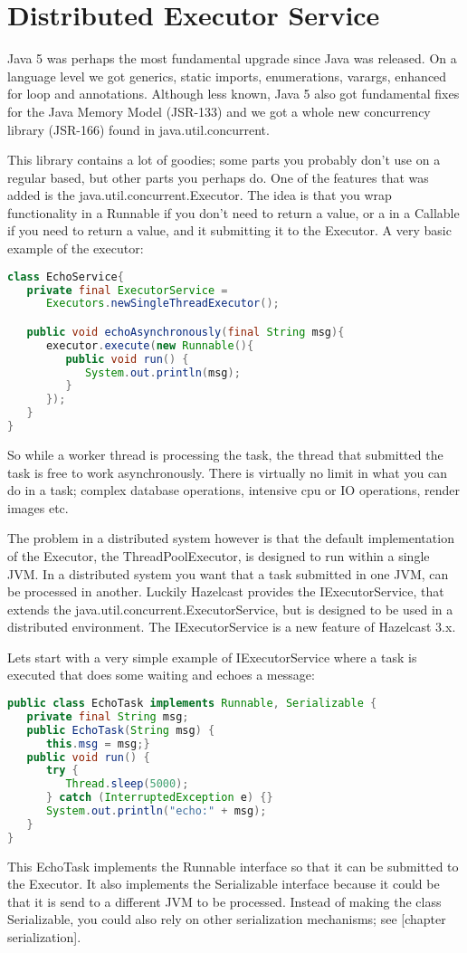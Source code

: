 \chapter{Distributed Executor Service}
Java 5 was perhaps the most fundamental upgrade since Java was released. On a language level we got generics, static imports, enumerations, varargs, enhanced for loop and annotations. Although less known, Java 5 also got fundamental fixes for the Java Memory Model (JSR-133) and we got a whole new concurrency library (JSR-166) found in java.util.concurrent.

This library contains a lot of goodies; some parts you probably don't use on a regular based, but other parts you perhaps do. One of the features that was added is the java.util.concurrent.Executor. The idea is that you wrap functionality in a Runnable if you don't need to return a value, or a in a Callable if you need to return a value, and it submitting it to the Executor. A very basic example of the executor:
\begin{lstlisting}[language=java]
class EchoService{
   private final ExecutorService = 
      Executors.newSingleThreadExecutor();

   public void echoAsynchronously(final String msg){
      executor.execute(new Runnable(){
         public void run() { 
            System.out.println(msg); 
         }
      });	
   }
}
\end{lstlisting}
So while a worker thread is processing the task, the thread that submitted the task is free to work asynchronously. There is virtually no limit in what you can do in a task; complex database operations, intensive cpu or IO operations, render images etc. 

The problem in a distributed system however is that the default implementation of the Executor, the ThreadPoolExecutor, is designed to run within a single JVM. In a distributed system you want that a task submitted in one JVM, can be processed in another. Luckily Hazelcast provides the IExecutorService, that extends the java.util.concurrent.ExecutorService, but is designed to be used in a distributed environment. The IExecutorService is a new feature of Hazelcast 3.x.

Lets start with a very simple example of IExecutorService where a task is executed that does some waiting and echoes a message:
\begin{lstlisting}[language=java]
public class EchoTask implements Runnable, Serializable {
   private final String msg;
   public EchoTask(String msg) {
      this.msg = msg;}
   public void run() {
      try { 
         Thread.sleep(5000);
      } catch (InterruptedException e) {}
      System.out.println("echo:" + msg);
   }
}
\end{lstlisting}
This EchoTask implements the Runnable interface so that it can be submitted to the Executor. It also implements the Serializable interface because it could be that it is send to a different JVM to be processed. Instead of making the class Serializable, you could also rely on other serialization mechanisms; see [chapter serialization]. 

